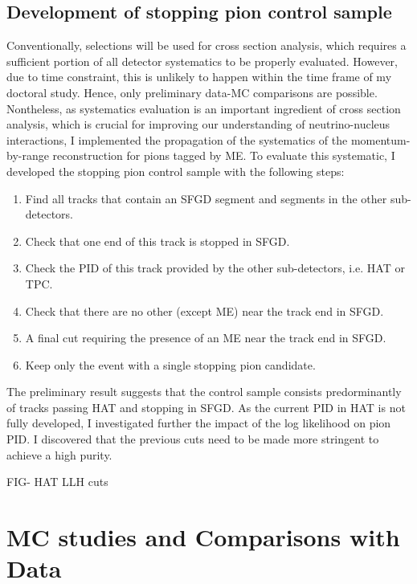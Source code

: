     \subsection{Development of stopping pion control sample}
          Conventionally, selections will be used for cross section analysis, which requires a sufficient portion of all detector systematics to be properly evaluated.
          However, due to time constraint, this is unlikely to happen within the time frame of my doctoral study. 
          Hence, only preliminary data-MC comparisons are possible.
          Nontheless, as systematics evaluation is an important ingredient of cross section analysis, which is crucial for improving our understanding of neutrino-nucleus interactions, I implemented the propagation of the systematics of the momentum-by-range reconstruction for pions tagged by ME.
          To evaluate this systematic, I developed the stopping pion control sample with the following steps:
          \begin{enumerate}
          \item Find all tracks that contain an SFGD segment and segments in the other sub-detectors.
          \item Check that one end of this track is stopped in SFGD.
          \item Check the PID of this track provided by the other sub-detectors, i.e. HAT or TPC.
          \item Check that there are no other (except ME) near the track end in SFGD.
          \item A final cut requiring the presence of an ME near the track end in SFGD.
          \item Keep only the event with a single stopping pion candidate.
          \end{enumerate}
          The preliminary result suggests that the control sample consists predorminantly of tracks passing HAT and stopping in SFGD.
          As the current PID in HAT is not fully developed, I investigated further the impact of the log likelihood on pion PID.
          I discovered that the previous cuts need to be made more stringent to achieve a high purity.

          FIG- HAT LLH cuts

           
    
    

\section{MC studies and Comparisons with Data}

